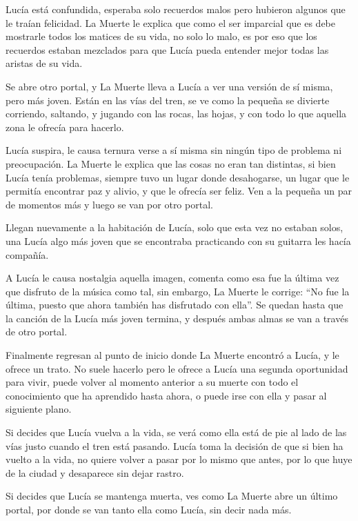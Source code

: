 Lucía está confundida, esperaba solo recuerdos malos pero hubieron algunos que le traían felicidad. La Muerte le explica que como el ser imparcial que es debe mostrarle todos los matices de su vida, no solo lo malo, es por eso que los recuerdos estaban mezclados para que Lucía pueda entender mejor todas las aristas de su vida.

Se abre otro portal, y La Muerte lleva a Lucía a ver una versión de sí misma, pero más joven. Están en las vías del tren, se ve como la pequeña se divierte corriendo, saltando, y jugando con las rocas, las hojas, y con todo lo que aquella zona le ofrecía para hacerlo.

Lucía suspira, le causa ternura verse a sí misma sin ningún tipo de problema ni preocupación. La Muerte le explica que las cosas no eran tan distintas, si bien Lucía tenía problemas, siempre tuvo un lugar donde desahogarse, un lugar que le permitía encontrar paz y alivio, y que le ofrecía ser feliz. Ven a la pequeña un par de momentos más y luego se van por otro portal.

Llegan nuevamente a la habitación de Lucía, solo que esta vez no estaban solos, una Lucía algo más joven que se encontraba practicando con su guitarra les hacía compañía. 
 
A Lucía le causa nostalgia aquella imagen, comenta como esa fue la última vez que disfruto de la música como tal, sin embargo, La Muerte le corrige: ``No fue la última, puesto que ahora también has disfrutado con ella''. Se quedan hasta que la canción de la Lucía más joven termina, y después ambas almas se van a través de otro portal.
 
Finalmente regresan al punto de inicio donde La Muerte encontró a Lucía, y le ofrece un trato. No suele hacerlo pero le ofrece a Lucía una segunda oportunidad para vivir, puede volver al momento anterior a su muerte con todo el conocimiento que ha aprendido hasta ahora, o puede irse con ella y pasar al siguiente plano.

Si decides que Lucía vuelva a la vida, se verá como ella está de pie al lado de las vías justo cuando el tren está pasando. Lucía toma la decisión de que si bien ha vuelto a la vida, no quiere volver a pasar por lo mismo que antes, por lo que huye de la ciudad y desaparece sin dejar rastro.

Si decides que Lucía se mantenga muerta, ves como La Muerte abre un último portal, por donde se van tanto ella como Lucía, sin decir nada más.


